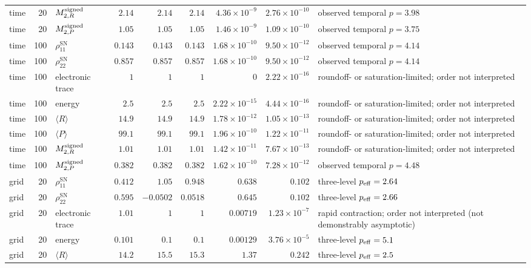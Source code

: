 \documentclass[
  11pt,
  letterpaper,
  onehalfspacing,
  normalmargins,
  equalmargins,
  oneside
]{ut-thesis}
\begin{document}
\begin{landscape}
\begin{longtable}{l r l r r r r r L{0.18\textwidth}}
time & 20 & $M^{\rm signed}_{2,R}$ & $2.14$ & $2.14$ & $2.14$ & $4.36\times10^{-9}$ & $2.76\times10^{-10}$ & observed temporal $p=3.98$ \\
time & 20 & $M^{\rm signed}_{2,P}$ & $1.05$ & $1.05$ & $1.05$ & $1.46\times10^{-9}$ & $1.09\times10^{-10}$ & observed temporal $p=3.75$ \\
time & 100 & $\rho_{11}^{\mathrm{SN}}$ & $0.143$ & $0.143$ & $0.143$ & $1.68\times10^{-10}$ & $9.50\times10^{-12}$ & observed temporal $p=4.14$ \\
time & 100 & $\rho_{22}^{\mathrm{SN}}$ & $0.857$ & $0.857$ & $0.857$ & $1.68\times10^{-10}$ & $9.50\times10^{-12}$ & observed temporal $p=4.14$ \\
time & 100 & electronic trace & $1$ & $1$ & $1$ & $0$ & $2.22\times10^{-16}$ & roundoff- or saturation-limited; order not interpreted \\
time & 100 & energy & $2.5$ & $2.5$ & $2.5$ & $2.22\times10^{-15}$ & $4.44\times10^{-16}$ & roundoff- or saturation-limited; order not interpreted \\
time & 100 & $\langle R\rangle$ & $14.9$ & $14.9$ & $14.9$ & $1.78\times10^{-12}$ & $1.05\times10^{-13}$ & roundoff- or saturation-limited; order not interpreted \\
time & 100 & $\langle P\rangle$ & $99.1$ & $99.1$ & $99.1$ & $1.96\times10^{-10}$ & $1.22\times10^{-11}$ & roundoff- or saturation-limited; order not interpreted \\
time & 100 & $M^{\rm signed}_{2,R}$ & $1.01$ & $1.01$ & $1.01$ & $1.42\times10^{-11}$ & $7.67\times10^{-13}$ & roundoff- or saturation-limited; order not interpreted \\
time & 100 & $M^{\rm signed}_{2,P}$ & $0.382$ & $0.382$ & $0.382$ & $1.62\times10^{-10}$ & $7.28\times10^{-12}$ & observed temporal $p=4.48$ \\
grid & 20 & $\rho_{11}^{\mathrm{SN}}$ & $0.412$ & $1.05$ & $0.948$ & $0.638$ & $0.102$ & three-level $p_{\rm eff}=2.64$ \\
grid & 20 & $\rho_{22}^{\mathrm{SN}}$ & $0.595$ & $-0.0502$ & $0.0518$ & $0.645$ & $0.102$ & three-level $p_{\rm eff}=2.66$ \\
grid & 20 & electronic trace & $1.01$ & $1$ & $1$ & $0.00719$ & $1.23\times10^{-7}$ & rapid contraction; order not interpreted (not demonstrably asymptotic) \\
grid & 20 & energy & $0.101$ & $0.1$ & $0.1$ & $0.00129$ & $3.76\times10^{-5}$ & three-level $p_{\rm eff}=5.1$ \\
grid & 20 & $\langle R\rangle$ & $14.2$ & $15.5$ & $15.3$ & $1.37$ & $0.242$ & three-level $p_{\rm eff}=2.5$ \\

\end{longtable}
\end{landscape}
\end{document}
